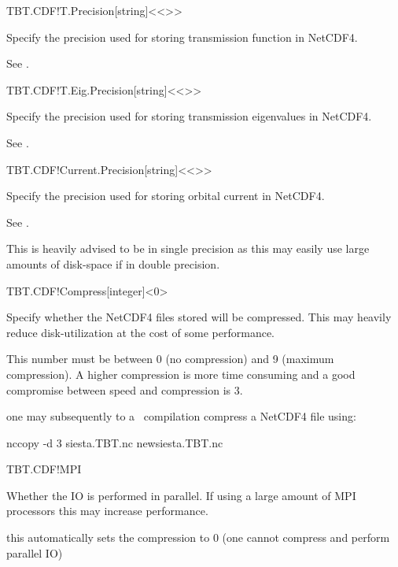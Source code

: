 \begin{fdfentry}{TBT.CDF!T.Precision}[string]<{<>}>

  Specify the precision used for storing transmission function in NetCDF4.

  See .
  
\end{fdfentry}

\begin{fdfentry}{TBT.CDF!T.Eig.Precision}[string]<{<>}>

  Specify the precision used for storing transmission eigenvalues in NetCDF4.

  See .
  
\end{fdfentry}

\begin{fdfentry}{TBT.CDF!Current.Precision}[string]<{<>}>

  Specify the precision used for storing orbital current in NetCDF4.

  See .

  \note This is heavily advised to be in single precision as this may
  easily use large amounts of disk-space if in double precision.
  
\end{fdfentry}

\begin{fdfentry}{TBT.CDF!Compress}[integer]<0>

  Specify whether the NetCDF4 files stored will be compressed. This
  may heavily reduce disk-utilization at the cost of some performance.

  This number must be between 0 (no compression) and 9 (maximum
  compression). A higher compression is more time consuming and a good
  compromise between speed and compression is 3.

  \note one may subsequently to a \tbtrans\ compilation compress a
  NetCDF4 file using:
\begin{shellexample}
   nccopy -d 3 siesta.TBT.nc newsiesta.TBT.nc
\end{shellexample}
  
\end{fdfentry}

\begin{fdflogicalF}{TBT.CDF!MPI}

  Whether the IO is performed in parallel. If using a large amount of
  MPI processors this may increase performance. 

  \note this automatically sets the compression to 0 (one cannot
  compress and perform parallel IO)

\end{fdflogicalF}

